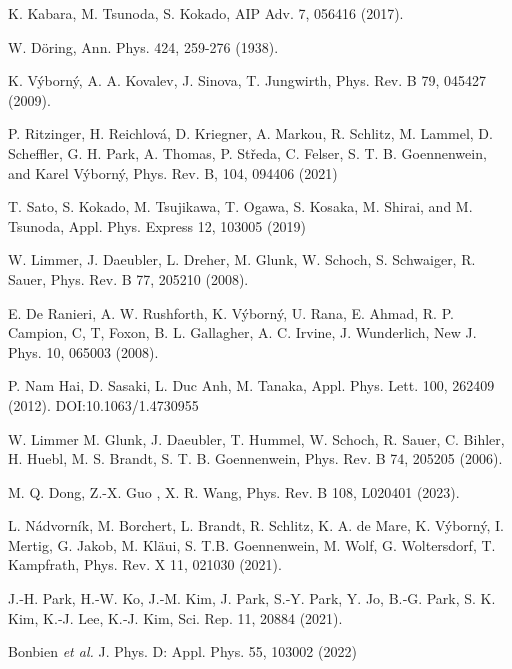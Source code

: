 \documentclass[prb,showpacs,amsmath,amssymb,superscriptaddress,twocolumn,floatfix]{revtex4-1}
\begin{document}
\begin{thebibliography}{99}
 K. Kabara, M. Tsunoda, S. Kokado, AIP Adv. 7, 056416 (2017). %

 W. D\"oring, Ann. Phys. 424, 259-276
(1938). %

 K. V\'yborn\'y, A. A. Kovalev, J. Sinova, T. Jungwirth, Phys. Rev. B 79, 045427 (2009). %
  
 P. Ritzinger, H. Reichlov\'a, D. Kriegner, A. Markou, R. Schlitz, M. Lammel, D. Scheffler, G. H. Park, A. Thomas, P. St\v{r}eda, C. Felser, S. T. B. Goennenwein, and Karel V\'yborn\'y, Phys. Rev. B, 104, 094406 (2021)

 T. Sato, S. Kokado, M. Tsujikawa, T. Ogawa, S. Kosaka, M. Shirai, and M. Tsunoda, Appl. Phys. Express 12, 103005 (2019)

 W. Limmer, J. Daeubler, L. Dreher, M. Glunk, W. Schoch, S. Schwaiger, R. Sauer, Phys. Rev. B 77, 205210 (2008). %

 E. De Ranieri, A. W. Rushforth, K. V\'yborn\'y, U. Rana, E. Ahmad, R. P. Campion, C, T, Foxon, B. L. Gallagher, A. C. Irvine, J. Wunderlich, New J. Phys. 10, 065003 (2008).%

 P. Nam Hai, D. Sasaki, L. Duc Anh, M. Tanaka, Appl. Phys. Lett. 100, 262409 (2012). DOI:10.1063/1.4730955

 W. Limmer M. Glunk, J. Daeubler, T. Hummel, W. Schoch, R. Sauer, C. Bihler, H. Huebl, M. S. Brandt, S. T. B. Goennenwein, Phys. Rev. B 74, 205205 (2006).%

 M. Q. Dong, Z.-X. Guo , X. R. Wang, Phys. Rev. B 108, L020401 (2023). %

 L. N\'{a}dvorn\'{i}k, M. Borchert, L. Brandt, R. Schlitz, K. A. de Mare, K. V\'{y}born\'{y}, I. Mertig, G. Jakob, M. {Kl\"{a}ui}, S. T.B. Goennenwein, M. Wolf, G. Woltersdorf, T. Kampfrath, Phys. Rev. X 11, 021030 (2021). %

 J.‑H. Park, H.‑W. Ko, J.‑M. Kim, J. Park, S.‑Y. Park, Y. Jo, B.‑G. Park, S. K. Kim, K.‑J. Lee, K.‑J. Kim, Sci. Rep. 11, 20884 (2021).%

 Bonbien \textit{et al.} J. Phys. D: Appl. Phys. 55, 103002 (2022)


\end{thebibliography}
\end{document}
